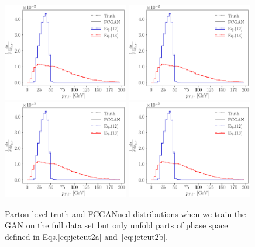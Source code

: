 \begin{figure}[t]
\centering
\includegraphics[page = 2, width=0.49\textwidth]{figures/cGAN/cGAN_overlap_2}
\includegraphics[page = 3, width=0.49\textwidth]{figures/cGAN/cGAN_overlap_2} \\
\includegraphics[page = 1, width=0.49\textwidth]{figures/cGAN/cGAN_overlap_2}
\includegraphics[page = 4, width=0.49\textwidth]{figures/cGAN/cGAN_overlap_2}
\caption{Parton level truth and FCGANned distributions when we train
  the GAN on the full data set but only unfold parts of phase space
  defined in Eqs.\eqref{eq:jetcut2a} and~\eqref{eq:jetcut2b}.}
\label{fig:distributions_FCGAN_sliced_2}
\end{figure}

